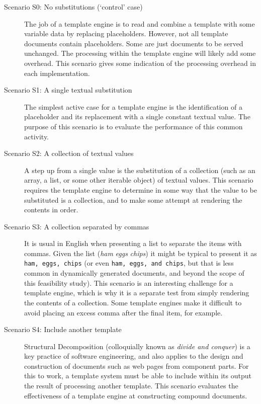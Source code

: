 \begin{description}
\item[Scenario S0: No substitutions (`control' case)] \hfill

The job of a template engine is to read and combine a template with some variable data by replacing placeholders. However, not all template documents contain placeholders. Some are just documents to be served unchanged. The processing within the template engine will likely add some overhead. This scenario gives some indication of the processing overhead in each implementation.

\item[Scenario S1: A single textual substitution] \hfill

The simplest active case for a template engine is the identification of a placeholder and its replacement with a single constant textual value. The purpose of this scenario is to evaluate the performance of this common activity.

\item[Scenario S2: A collection of textual values] \hfill

A step up from a single value is the substitution of a collection (such as an array, a list, or some other iterable object) of textual values. This scenario requires the template engine to determine in some way that the value to be substituted is a collection, and to make some attempt at rendering the contents in order.

\item[Scenario S3: A collection separated by commas] \hfill

It is usual in English when presenting a list to separate the items with commas. Given the list (\emph{ham} \emph{eggs} \emph{chips}) it might be typical to present it as \texttt{ham, eggs, chips} (or even \texttt{ham, eggs, and chips}, but that is less common in dynamically generated documents, and beyond the scope of this feasibility study). This scenario is an interesting challenge for a template engine, which is why it is a separate test from simply rendering the contents of a collection. Some template engines make it difficult to avoid placing an excess comma after the final item, for example.

\item[Scenario S4: Include another template] \hfill

Structural Decomposition (colloquially known as \emph{divide and conquer}) is a key practice of software engineering, and also applies to the design and construction of documents such as web pages from component parts. For this to work, a template system must be able to include within its output the result of processing another template. This scenario evaluates the effectiveness of a template engine at constructing compound documents.


\end{description}
